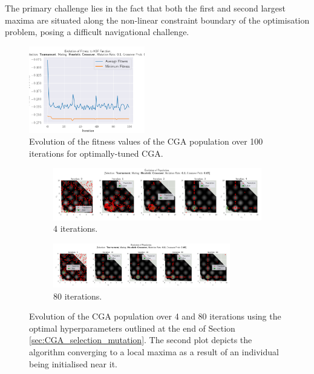 \documentclass[10pt]{article}
\begin{document}
\begin{multicols}{2}
The primary challenge lies in the fact that both the first and second largest maxima are situated along the non-linear constraint boundary of the optimisation problem, posing a difficult navigational challenge.
\vspace{-1mm}
\begin{figure}[H]
    \centering
    \includegraphics[width=0.45\textwidth]{../figures/Permanent Images/0.1_0.65_Fitness.png}
    \captionsetup{justification=centering}
    \caption{Evolution of the fitness values of the CGA population over 100 iterations for optimally-tuned CGA.}
    \label{fig:CGA_fitness_evo_OPT}
\end{figure}
\end{multicols}
\begin{figure}[H]
    \centering
    \begin{subfigure}{0.85\textwidth}
        \centering
        \includegraphics[width=\textwidth]{../figures/Permanent Images/0.1_0.65_Population.png}
        \caption{4 iterations.}
        \label{fig:optimal_5}
    \end{subfigure}
    \begin{subfigure}{\textwidth}
        \centering
        \includegraphics[width=0.85\textwidth]{../figures/Permanent Images/0.1_0.65_Population100.png}
        \caption{80 iterations.}
        \label{fig:optimat_100}
    \end{subfigure}
    \captionsetup{justification=centering}
    \caption{Evolution of the CGA population over 4 and 80 iterations using the optimal hyperparameters outlined at the end of Section \ref{sec:CGA_selection_mutation}. The second plot depicts the algorithm converging to a local maxima as a result of an individual being initialised near it.}
    \label{fig:optimal_convergence}
\end{figure}
\end{document}
